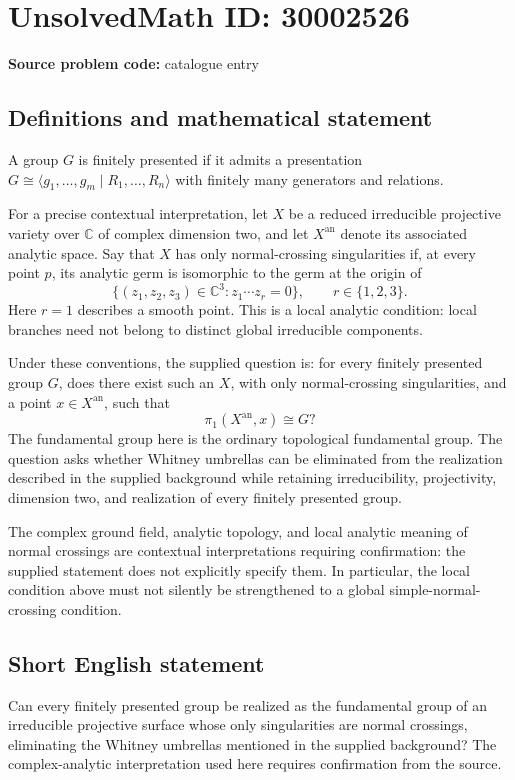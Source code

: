 \documentclass[11pt]{article}
\newcommand{\C}{\mathbb{C}}
\begin{document}
\section*{UnsolvedMath ID: 30002526}
\textbf{Source problem code:} catalogue entry
\subsection{Definitions and mathematical statement}
A group \(G\) is finitely presented if it admits a presentation \(G\cong\langle g_1,\ldots,g_m\mid R_1,\ldots,R_n\rangle\) with finitely many generators and relations.

For a precise contextual interpretation, let \(X\) be a reduced irreducible projective variety over \(\C\) of complex dimension two, and let \(X^{\mathrm{an}}\) denote its associated analytic space. Say that \(X\) has only normal-crossing singularities if, at every point \(p\), its analytic germ is isomorphic to the germ at the origin of
\[
\{(z_1,z_2,z_3)\in\C^3:z_1\cdots z_r=0\},\qquad r\in\{1,2,3\}.
\]
Here \(r=1\) describes a smooth point. This is a local analytic condition: local branches need not belong to distinct global irreducible components.

Under these conventions, the supplied question is: for every finitely presented group \(G\), does there exist such an \(X\), with only normal-crossing singularities, and a point \(x\in X^{\mathrm{an}}\), such that
\[
\pi_1(X^{\mathrm{an}},x)\cong G?
\]
The fundamental group here is the ordinary topological fundamental group. The question asks whether Whitney umbrellas can be eliminated from the realization described in the supplied background while retaining irreducibility, projectivity, dimension two, and realization of every finitely presented group.

The complex ground field, analytic topology, and local analytic meaning of normal crossings are contextual interpretations requiring confirmation: the supplied statement does not explicitly specify them. In particular, the local condition above must not silently be strengthened to a global simple-normal-crossing condition.
\subsection{Short English statement}
Can every finitely presented group be realized as the fundamental group of an irreducible projective surface whose only singularities are normal crossings, eliminating the Whitney umbrellas mentioned in the supplied background? The complex-analytic interpretation used here requires confirmation from the source.
\end{document}
